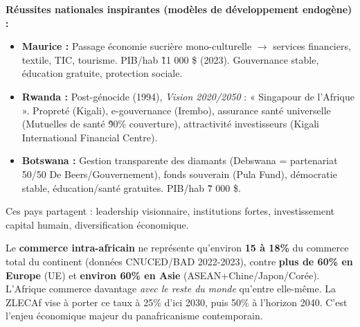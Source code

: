 \documentclass[11pt]{article}
\newcommand{\cle}[1]{{\popxbold\color{popdark}#1}}
\begin{document}
\textbf{Réussites nationales inspirantes (modèles de développement endogène) :}
\begin{itemize}
    \item \textbf{Maurice :} Passage économie sucrière mono-culturelle $\to$ services financiers, textile, TIC, tourisme. PIB/hab \~11 000 \$ (2023). Gouvernance stable, éducation gratuite, protection sociale.
    \item \textbf{Rwanda :} Post-génocide (1994), \emph{Vision 2020/2050} : « Singapour de l'Afrique ». Propreté (Kigali), e-gouvernance (Irembo), assurance santé universelle (Mutuelles de santé \~90\% couverture), attractivité investisseurs (Kigali International Financial Centre).
    \item \textbf{Botswana :} Gestion transparente des diamants (Debswana = partenariat 50/50 De Beers/Gouvernement), fonds souverain (Pula Fund), démocratie stable, éducation/santé gratuites. PIB/hab \~7 000 \$.
\end{itemize}
Ces pays partagent : \cle{leadership visionnaire}, \cle{institutions fortes}, \cle{investissement capital humain}, \cle{diversification économique}.

\begin{exemplebox}
Le \textbf{commerce intra-africain} ne représente qu'environ \textbf{15 à 18\%} du commerce total du continent (données CNUCED/BAD 2022-2023), contre \textbf{plus de 60\% en Europe} (UE) et \textbf{environ 60\% en Asie} (ASEAN+Chine/Japon/Corée). L'Afrique commerce davantage \emph{avec le reste du monde} qu'entre elle-même. La ZLECAf vise à porter ce taux à 25\% d'ici 2030, puis 50\% à l'horizon 2040. C'est l'enjeu économique majeur du panafricanisme contemporain.
\end{exemplebox}
\end{document}

